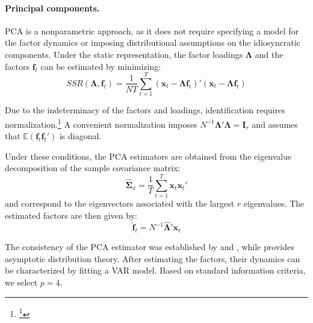 \paragraph{Principal components.}

PCA is a nonparametric approach, as it does not require specifying a model for the factor dynamics or imposing distributional assumptions on the idiosyncratic components. Under the static representation, the factor loadings $\boldsymbol{\Lambda}$ and the factors $\boldsymbol{f}_t$ can be estimated by minimizing:
\begin{equation}
SSR(\boldsymbol{\Lambda}, \boldsymbol{f}_t) = \frac{1}{NT} \sum_{t=1}^{T} (\boldsymbol{x}_t - \boldsymbol{\Lambda} \boldsymbol{f}_t)' (\boldsymbol{x}_t - \boldsymbol{\Lambda} \boldsymbol{f}_t)
\end{equation}

Due to the indeterminacy of the factors and loadings, identification requires normalization.\footnote{\footnote{This reflects the fact that both the factors and loadings are unobserved and only their product is identified. To illustrate the identification issue, consider any invertible $r \times r$ matrix $\boldsymbol{Q}$. Then, the common component $\boldsymbol{\Lambda} \boldsymbol{f}_t$ is observationally equivalent to $\boldsymbol{\Lambda}^* \boldsymbol{f}_t^* = (\boldsymbol{\Lambda} \boldsymbol{Q}^{-1})(\boldsymbol{Q} \boldsymbol{f}_t)$, where $\boldsymbol{\Lambda}^* = \boldsymbol{\Lambda} \boldsymbol{Q}^{-1}$ and $\boldsymbol{f}_t^* = \boldsymbol{Q} \boldsymbol{f}_t$.}} A convenient normalization imposes $N^{-1}\boldsymbol{\Lambda}'\boldsymbol{\Lambda} = \boldsymbol{I}_r$ and assumes that $\mathbb{E}(\boldsymbol{f}_t \boldsymbol{f}_t')$ is diagonal.

Under these conditions, the PCA estimators are obtained from the eigenvalue decomposition of the sample covariance matrix:
\begin{equation}
\hat{\boldsymbol{\Sigma}}_x = \frac{1}{T} \sum_{t=1}^{T} \boldsymbol{x}_t \boldsymbol{x}_t'
\end{equation}
and correspond to the eigenvectors associated with the largest $r$ eigenvalues. The estimated factors are then given by:
\begin{equation}
\hat{\boldsymbol{f}}_t = N^{-1} \hat{\boldsymbol{\Lambda}}' \boldsymbol{x}_t
\end{equation}

The consistency of the PCA estimator was established by \citet{bai2002determining} and \citet{stock2002forecasting}, while \citet{bai2003inferential} provides asymptotic distribution theory. After estimating the factors, their dynamics can be characterized by fitting a VAR model. Based on standard information criteria, we select $p = 4$.

